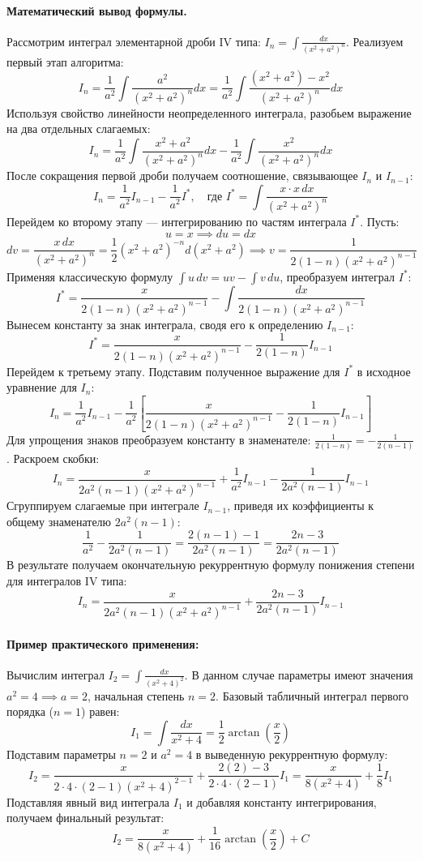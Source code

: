 \paragraph{Математический вывод формулы.}
Рассмотрим интеграл элементарной дроби IV типа: $I_n = \int \frac{dx}{(x^2+a^2)^n}$. Реализуем первый этап алгоритма:
$$ I_n = \frac{1}{a^2} \int \frac{a^2}{(x^2+a^2)^n} dx = \frac{1}{a^2} \int \frac{(x^2+a^2) - x^2}{(x^2+a^2)^n} dx $$
Используя свойство линейности неопределенного интеграла, разобьем выражение на два отдельных слагаемых:
$$ I_n = \frac{1}{a^2} \int \frac{x^2+a^2}{(x^2+a^2)^n} dx - \frac{1}{a^2} \int \frac{x^2}{(x^2+a^2)^n} dx $$
После сокращения первой дроби получаем соотношение, связывающее $I_n$ и $I_{n-1}$:
$$ I_n = \frac{1}{a^2} I_{n-1} - \frac{1}{a^2} I^*, \quad \text{где } I^* = \int \frac{x \cdot x \, dx}{(x^2+a^2)^n} $$
Перейдем ко второму этапу — интегрированию по частям интеграла $I^*$. Пусть:
$$ u = x \implies du = dx $$
$$ dv = \frac{x \, dx}{(x^2+a^2)^n} = \frac{1}{2} (x^2+a^2)^{-n} d(x^2+a^2) \implies v = \frac{1}{2(1-n)(x^2+a^2)^{n-1}} $$
Применяя классическую формулу $\int u \, dv = uv - \int v \, du$, преобразуем интеграл $I^*$:
$$ I^* = \frac{x}{2(1-n)(x^2+a^2)^{n-1}} - \int \frac{dx}{2(1-n)(x^2+a^2)^{n-1}} $$
Вынесем константу за знак интеграла, сводя его к определению $I_{n-1}$:
$$ I^* = \frac{x}{2(1-n)(x^2+a^2)^{n-1}} - \frac{1}{2(1-n)} I_{n-1} $$
Перейдем к третьему этапу. Подставим полученное выражение для $I^*$ в исходное уравнение для $I_n$:
$$ I_n = \frac{1}{a^2} I_{n-1} - \frac{1}{a^2} \left[ \frac{x}{2(1-n)(x^2+a^2)^{n-1}} - \frac{1}{2(1-n)} I_{n-1} \right] $$
Для упрощения знаков преобразуем константу в знаменателе: $\frac{1}{2(1-n)} = -\frac{1}{2(n-1)}$. Раскроем скобки:
$$ I_n = \frac{x}{2a^2(n-1)(x^2+a^2)^{n-1}} + \frac{1}{a^2} I_{n-1} - \frac{1}{2a^2(n-1)} I_{n-1} $$
Сгруппируем слагаемые при интеграле $I_{n-1}$, приведя их коэффициенты к общему знаменателю $2a^2(n-1)$:
$$ \frac{1}{a^2} - \frac{1}{2a^2(n-1)} = \frac{2(n-1) - 1}{2a^2(n-1)} = \frac{2n - 3}{2a^2(n-1)} $$
В результате получаем окончательную рекуррентную формулу понижения степени для интегралов IV типа:
$$ I_n = \frac{x}{2a^2(n-1)(x^2+a^2)^{n-1}} + \frac{2n-3}{2a^2(n-1)} I_{n-1} $$

\paragraph{Пример практического применения:} Вычислим интеграл $I_2 = \int \frac{dx}{(x^2+4)^2}$.
В данном случае параметры имеют значения $a^2 = 4 \implies a = 2$, начальная степень $n = 2$. 
Базовый табличный интеграл первого порядка ($n=1$) равен:
$$ I_1 = \int \frac{dx}{x^2+4} = \frac{1}{2} \arctan\left(\frac{x}{2}\right) $$
Подставим параметры $n=2$ и $a^2=4$ в выведенную рекуррентную формулу:
$$ I_2 = \frac{x}{2 \cdot 4 \cdot (2-1)(x^2+4)^{2-1}} + \frac{2(2)-3}{2 \cdot 4 \cdot (2-1)} I_1 = \frac{x}{8(x^2+4)} + \frac{1}{8} I_1 $$
Подставляя явный вид интеграла $I_1$ и добавляя константу интегрирования, получаем финальный результат:
$$ I_2 = \frac{x}{8(x^2+4)} + \frac{1}{16} \arctan\left(\frac{x}{2}\right) + C $$


